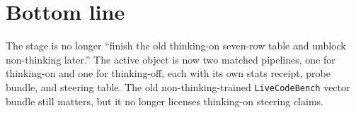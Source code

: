 \documentclass[11pt]{article}
\begin{document}
\section*{Bottom line}
The stage is no longer ``finish the old thinking-on seven-row table and unblock non-thinking later.'' The active object is now two matched pipelines, one for thinking-on and one for thinking-off, each with its own stats receipt, probe bundle, and steering table. The old non-thinking-trained \texttt{LiveCodeBench} vector bundle still matters, but it no longer licenses thinking-on steering claims.
\end{document}
